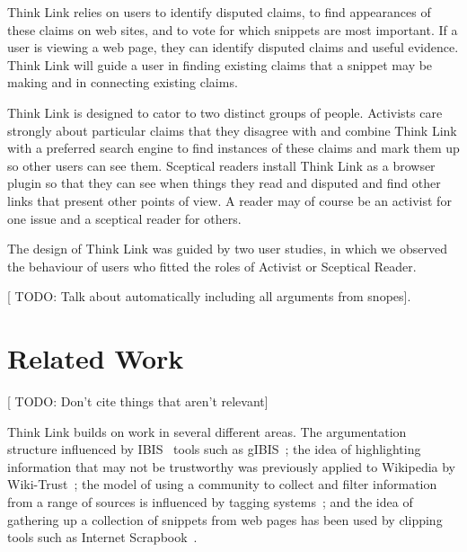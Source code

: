 \documentclass{chi2009}
\newcommand{\todo}[1]{{[\color{blue} TODO: #1]}}
\begin{document}
Think Link relies on users to identify disputed claims, to find appearances of these claims on web sites, and to vote for which snippets are most important. If a user is viewing a web page, they can identify disputed claims and useful evidence. Think Link will guide a user in finding existing claims that a snippet may be making and in connecting existing claims.

Think Link is designed to cator to two distinct groups of people. Activists care strongly about particular claims that they disagree with and combine Think Link with a preferred search engine to find instances of these claims and mark them up so other users can see them. Sceptical readers install Think Link as a browser plugin so that they can see when things they read and disputed and find other links that present other points of view. A reader may of course be an activist for one issue and a sceptical reader for others.

The design of Think Link was guided by two user studies, in which we observed the behaviour of users who fitted the roles of Activist or Sceptical Reader. 

\todo{Talk about automatically including all arguments from snopes}.





\section{Related Work}
\todo{Don't cite things that aren't relevant}

Think Link builds on work in several different areas. The argumentation structure influenced by IBIS~\cite{Rittel1973} tools such as gIBIS~\cite{Conklin1987a}; the idea of highlighting information that may not be trustworthy was previously applied to Wikipedia by Wiki-Trust~\cite{Adler2008}; the model of using a community to collect and filter information from a range of sources is influenced by tagging systems~\cite{Marlow2006}; and the idea of gathering up a collection of snippets from web pages has been used by clipping tools such as Internet Scrapbook~\cite{Sugiura1998}. 
\end{document}
